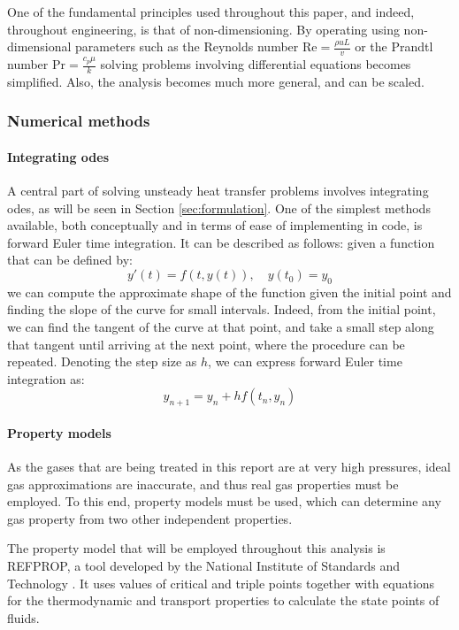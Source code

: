 One of the fundamental principles used throughout this paper, and indeed, throughout engineering, is that of non-dimensioning. By operating using non-dimensional parameters such as the Reynolds number $\text{Re} = \frac{\rho u L}{v}$ or the Prandtl number $\text{Pr} = \frac{c_p \mu}{k}$ solving problems involving differential equations becomes simplified. Also, the analysis becomes much more general, and can be scaled.

\subsubsection{Numerical methods}
\label{sec:numerical_methods}
\paragraph{Integrating \glspl{ode}}

A central part of solving unsteady heat transfer problems involves integrating \glspl{ode}, as will be seen in Section \ref{sec:formulation}. One of the simplest methods available, both conceptually and in terms of ease of implementing in code, is forward Euler time integration. It can be described as follows: given a function that can be defined by: 
\begin{equation}
y'(t) = f(t,y(t)), \quad y(t_0) = y_0
\end{equation}
we can compute the approximate shape of the function given the initial point and finding the slope of the curve for small intervals. Indeed, from the initial point, we can find the tangent of the curve at that point, and take a small step along that tangent until arriving at the next point, where the procedure can be repeated. Denoting the step size as $h$, we can express forward Euler time integration as:
\begin{equation}
y_{n+1} =  y_n + hf(t_n,y_n)
\end{equation}

\paragraph{Property models}
\label{sec:property_models}
As the gases that are being treated in this report are at very high pressures, ideal gas approximations are inaccurate, and thus real gas properties must be employed. To this end, property models must be used, which can determine any gas property from two other independent properties.

The property model that will be employed throughout this analysis is REFPROP, a tool developed by the National Institute of Standards and Technology \cite{refprop}. It uses values of critical and triple points together with equations for the thermodynamic and transport properties to calculate the state points of fluids.



